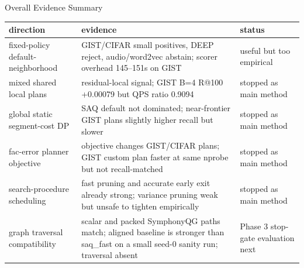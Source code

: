 \documentclass[aspectratio=169,10pt]{beamer}
\begin{document}
\begin{frame}[fragile]{Overall Evidence Summary}
\scriptsize
\begin{tabularx}{\textwidth}{lXX}
\toprule
direction & evidence & status \\
\midrule
fixed-policy default-neighborhood & GIST/CIFAR small positives, DEEP reject, audio/word2vec abstain; scorer overhead 145--151s on GIST & useful but too empirical \\
mixed shared local plans & residual-local signal; GIST B=4 R@100 +0.00079 but QPS ratio 0.9094 & stopped as main method \\
global static segment-cost DP & SAQ default not dominated; near-frontier GIST plans slightly higher recall but slower & stopped as main method \\
fac-error planner objective & objective changes GIST/CIFAR plans; GIST custom plan faster at same nprobe but not recall-matched & stopped as main method \\
search-procedure scheduling & fast pruning and accurate early exit already strong; variance pruning weak but unsafe to tighten empirically & stopped as main method \\
graph traversal compatibility & scalar and packed SymphonyQG paths match; aligned baseline is stronger than saq\_fast on a small seed-0 sanity run; traversal absent & Phase 3 stop-gate evaluation next \\
\bottomrule
\end{tabularx}
\end{frame}
\end{document}
